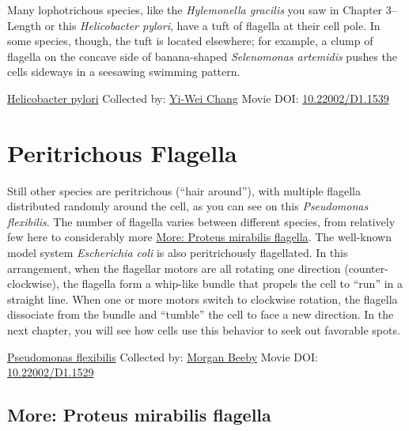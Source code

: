 \documentclass[]{tufte-book}
\begin{document}
Many lophotrichous species, like the \emph{Hylemonella gracilis} you saw in Chapter 3--Length or this \emph{Helicobacter pylori}, have a tuft of flagella at their cell pole. In some species, though, the tuft is located elsewhere; for example, a clump of flagella on the concave side of banana-shaped \emph{Selenomonas artemidis} pushes the cells sideways in a seesawing swimming pattern.



\hypertarget{htmlwidget-84bf01b61fb5431e8dd7}{}

\label{fig:6-4a}\protect\hyperlink{tree}{Helicobacter pylori} Collected by: \protect\hyperlink{yi-wei_chang}{Yi-Wei Chang} Movie DOI: \href{https://doi.org/10.22002/D1.1539}{10.22002/D1.1539}

\hypertarget{peritrichous-flagella}{%
\section{Peritrichous Flagella}\label{peritrichous-flagella}}

Still other species are peritrichous (``hair around''), with multiple flagella distributed randomly around the cell, as you can see on this \emph{Pseudomonas flexibilis}. The number of flagella varies between different species, from relatively few here to considerably more \protect\hyperlink{Proteus_mirabilis_flagella}{More: Proteus mirabilis flagella}. The well-known model system \emph{Escherichia coli} is also peritrichously flagellated. In this arrangement, when the flagellar motors are all rotating one direction (counter-clockwise), the flagella form a whip-like bundle that propels the cell to ``run'' in a straight line. When one or more motors switch to clockwise rotation, the flagella dissociate from the bundle and ``tumble'' the cell to face a new direction. In the next chapter, you will see how cells use this behavior to seek out favorable spots.



\hypertarget{htmlwidget-3adc2b1850f01f870f8a}{}

\label{fig:6-5}\protect\hyperlink{tree}{Pseudomonas flexibilis} Collected by: \protect\hyperlink{morgan_beeby}{Morgan Beeby} Movie DOI: \href{https://doi.org/10.22002/D1.1529}{10.22002/D1.1529}

\hypertarget{Proteus_mirabilis_flagella}{%
\subsection*{More: Proteus mirabilis flagella}\label{Proteus_mirabilis_flagella}}
\end{document}
